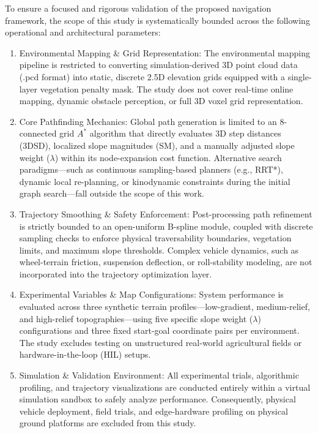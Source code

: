 To ensure a focused and rigorous validation of the proposed navigation framework, the scope of this study is systematically bounded across the following operational and architectural parameters:
\begin{enumerate}
    \item Environmental Mapping \& Grid Representation: The environmental mapping pipeline is restricted to converting simulation-derived 3D point cloud data (.pcd format) into static, discrete 2.5D elevation grids equipped with a single-layer vegetation penalty mask. The study does not cover real-time online mapping, dynamic obstacle perception, or full 3D voxel grid representation.
    \item Core Pathfinding Mechanics: Global path generation is limited to an 8-connected grid $A^*$ algorithm that directly evaluates 3D step distances (3DSD), localized slope magnitudes (SM), and a manually adjusted slope weight ($\lambda$) within its node-expansion cost function. Alternative search paradigms—such as continuous sampling-based planners (e.g., RRT*), dynamic local re-planning, or kinodynamic constraints during the initial graph search—fall outside the scope of this work.
    \item Trajectory Smoothing \& Safety Enforcement: Post-processing path refinement is strictly bounded to an open-uniform B-spline module, coupled with discrete sampling checks to enforce physical traversability boundaries, vegetation limits, and maximum slope thresholds. Complex vehicle dynamics, such as wheel-terrain friction, suspension deflection, or roll-stability modeling, are not incorporated into the trajectory optimization layer.
    \item Experimental Variables \& Map Configurations: System performance is evaluated across three synthetic terrain profiles—low-gradient, medium-relief, and high-relief topographies—using five specific slope weight ($\lambda$) configurations and three fixed start-goal coordinate pairs per environment. The study excludes testing on unstructured real-world agricultural fields or hardware-in-the-loop (HIL) setups.
    \item Simulation \& Validation Environment: All experimental trials, algorithmic profiling, and trajectory visualizations are conducted entirely within a virtual simulation sandbox to safely analyze performance. Consequently, physical vehicle deployment, field trials, and edge-hardware profiling on physical ground platforms are excluded from this study.
\end{enumerate}

